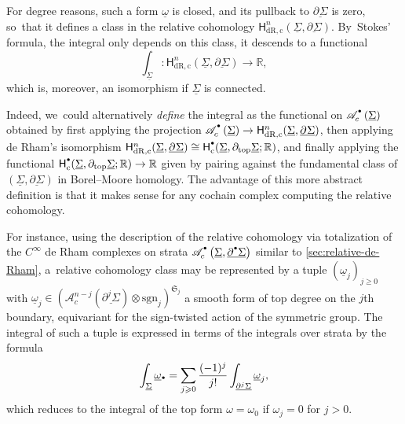 \documentclass[JEP,XML,SOM,Unicode,NoFloatCountersInSection,published]{cedram}
\let\oldbullet\bullet
\renewcommand{\bullet}{{\raisebox{1pt}{$\scriptscriptstyle\oldbullet$}}}
\theoremstyle{definition}
\theoremstyle{remark}
\newcommand{\RR}{\mathbb{R}}
\renewcommand{\ge}{\geqslant}
\newcommand{\uomega}{\underline{\omega}}
\newcommand{\rbrac}[1]{\left(#1\right)}
\newcommand{\Ac}[2][\bullet]{\mathscr{A}_c^{#1}\rbrac{#2}}
\newcommand{\uSig}{\underline{\Sigma}}
\newcommand{\ubdSig}[1][]{\underline{\partial^{#1}\Sigma}}
\newcommand{\HdRc}[2][\bullet]{\mathsf{H}_{\mathrm{dR},\mathrm{c}}^{#1}(#2)}
\newcommand{\symgp}[1]{\mathfrak{S}_{#1}}
\newcommand{\sgn}[1]{\mathrm{sgn}_{#1}}
\begin{document}
For degree reasons, such a form $\uomega$ is closed, and its pullback to $\ubdSig$ is zero, so~that it defines a class in the relative cohomology $\HdRc[n]{\uSig,\ubdSig}$. By~Stokes' formula, the integral only depends on this class, \ie it descends to a functional
\[
\int_{\uSig} : \HdRc[n]{\uSig,\ubdSig} \to \RR,
\]
which is, moreover, an isomorphism if $\uSig$ is connected.

Indeed, we~could alternatively \emph{define} the integral as the functional on $\Ac{\uSig}$ obtained by first applying the projection $\Ac{\uSig} \to \HdRc[n]{\uSig,\ubdSig}$, then applying de Rham's isomorphism $\HdRc[n]{\uSig,\ubdSig}\cong \mathsf{H}^\bullet_\mathrm{c}(\uSig,\partial_{\mathrm{top}}\uSig;\RR)$, and finally applying the functional $\mathsf{H}^\bullet_\mathrm{c}(\uSig,\partial_{\mathrm{top}}\uSig;\RR) \to \RR$ given by pairing against the fundamental class of $(\uSig,\ubdSig)$ in Borel--Moore homology. The advantage of this more abstract definition is that it makes sense for any cochain complex computing the relative cohomology.

For instance, using the description of the relative cohomology via totalization of the $C^\infty$ de Rham complexes on strata $\Ac{\uSig,\ubdSig[\bullet]}$ similar to \autoref{sec:relative-de-Rham}, a~relative cohomology class may be represented by a tuple $(\uomega_j)_{j \ge0}$ with \hbox{$\uomega_j\!\in\! (\Ac[n-j]{\ubdSig[j]}\otimes\sgn{j})^{\symgp{j}}$} a smooth form of top degree on the $j$th boundary, equivariant for the sign-twisted action of the symmetric group. The integral of such a tuple is expressed in terms of the integrals over strata by the formula\vspace*{-3pt}
\[
\int_{\uSig}\uomega_\bullet= \sum_{j \ge 0} \frac{(-1)^j}{j!} \int_{\ubdSig[j]}\uomega_j,
\]
which reduces to the integral of the top form $\omega = \omega_0$ if $\omega_j = 0$ for $j>0$.
\end{document}
